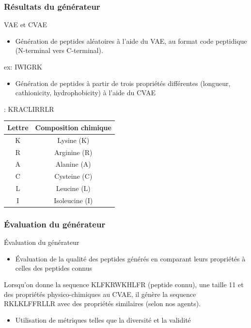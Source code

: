 \begin{frame}
    \frametitle{Résultats du générateur}
    \begin{block}{VAE et CVAE}
        \begin{itemize}
        \item Génération de peptides aléatoires à l'aide du VAE, au format code peptidique (N-terminal vers C-terminal).
        \end{itemize}
        \centering
        ex: IWIGRK

        \begin{itemize}
        \item Génération de peptides à partir de trois propriétés différentes (longueur, cathionicity, hydrophobicity) à l'aide du CVAE
        \end{itemize}

        : KRACLIRRLR

        \begin{center}
        \begin{tabular}{|c|c|}
        \hline
        Lettre & Composition chimique \\
        \hline
        K & Lysine (K) \\
        R & Arginine (R) \\
        A & Alanine (A) \\
        C & Cysteine (C) \\
        L & Leucine (L) \\
        I & Isoleucine (I) \\
        \hline
        \end{tabular}
        \end{center}
    \end{block}
\end{frame}

\begin{frame}
    \frametitle{Évaluation du générateur}
    \begin{block}{Évaluation du générateur}
        \begin{itemize}
        \item Évaluation de la qualité des peptides générés en comparant leurs propriétés à celles des peptides connus
        \end{itemize}
        \centering
        Lorsqu'on donne la sequence KLFKRWKHLFR (peptide connu), une taille 11 et des propriétés physico-chimiques au CVAE, il génère la sequence RKLKLFFRLLR avec des propriétés similaires (selon nos agents).

        \begin{itemize}
        \item Utilisation de métriques telles que la diversité et la validité
        \end{itemize}
    \end{block}
\end{frame}


